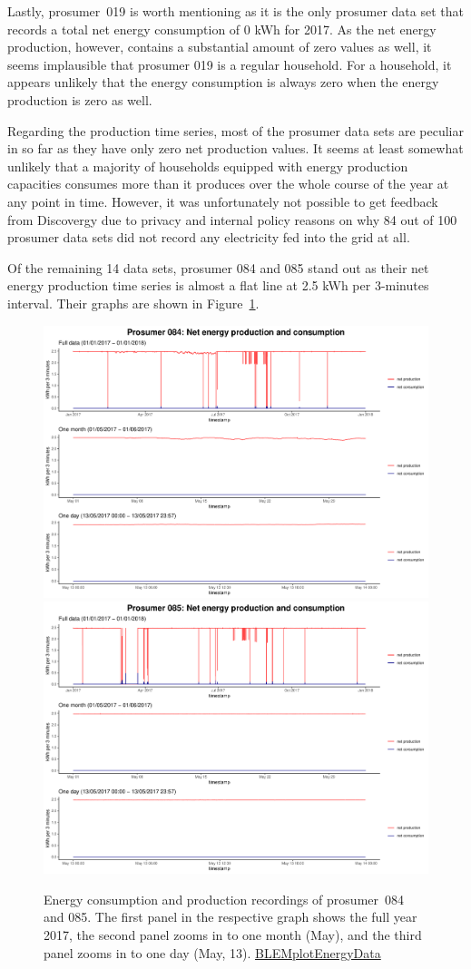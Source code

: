 Lastly, prosumer~019 is worth mentioning as it is the only prosumer data set that records a total net energy consumption of 0 kWh for 2017. As the net energy production, however, contains a substantial amount of zero values as well, it seems implausible that prosumer 019 is a regular household. For a household, it appears unlikely that the energy consumption is always zero when the energy production is zero as well.

Regarding the production time series, most of the prosumer data sets are peculiar in so far as they have only zero net production values. It seems at least somewhat unlikely that a majority of households equipped with energy production capacities consumes more than it produces over the whole course of the year at any point in time. However, it was unfortunately not possible to get feedback from Discovergy due to privacy and internal policy reasons on why 84 out of 100 prosumer data sets did not record any electricity fed into the grid at all.

Of the remaining 14 data sets, prosumer 084 and 085 stand out as their net energy production time series is almost a flat line at 2.5 kWh per 3-minutes interval. Their graphs are shown in Figure~\ref{Fig:energyconsprod_p084p085}.

\begin{figure}
\centering
\includegraphics[width=.5\textwidth-0.15em]{thesis/graphs/timeseries/p084_prod&cons.pdf}
\includegraphics[width=.5\textwidth-0.15em]{thesis/graphs/timeseries/p085_prod&cons.pdf}

\caption[Energy consumption and production recordings of prosumer 084 and 085]{Energy consumption and production recordings of prosumer~084 and 085. The first panel in the respective graph shows the full year 2017, the second panel zooms in to one month (May), and the third panel zooms in to one day (May, 13). \quantnet\href{https://github.com/QuantLet/BLEM/tree/master/BLEMplotEnergyData}{BLEMplotEnergyData}}
\label{Fig:energyconsprod_p084p085}
\end{figure}

